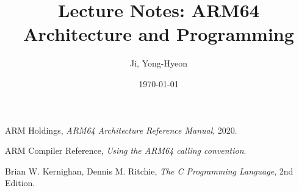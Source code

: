 \documentclass[12pt]{article}
\begin{document}
	
	\title{Lecture Notes: ARM64 Architecture and Programming}
	\author{Ji, Yong-Hyeon}
	\date{\today}
	\maketitle
	
	\tableofcontents  %
	\newpage
	
	
	
	\begin{thebibliography}{99}
		ARM Holdings, \textit{ARM64 Architecture Reference Manual}, 2020.
		
		ARM Compiler Reference, \textit{Using the ARM64 calling convention}.
		
		Brian W. Kernighan, Dennis M. Ritchie, \textit{The C Programming Language}, 2nd Edition.
	\end{thebibliography}
	
	
\end{document}
